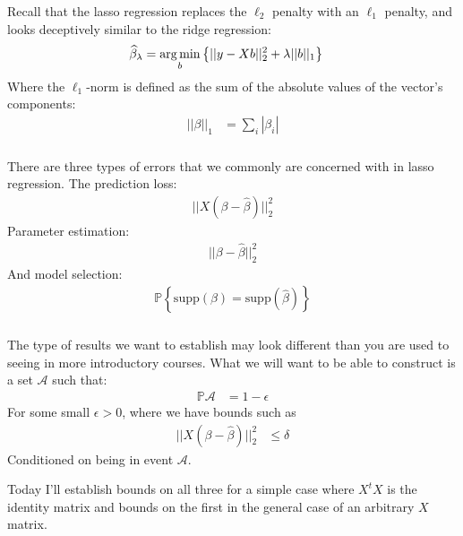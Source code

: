\begin{frame}[fragile] \frametitle{}

Recall that the lasso regression replaces the $\ell_2$ penalty with an $\ell_1$ penalty,
and looks deceptively similar to the ridge regression:
\begin{align*}
\widehat{\beta}_\lambda &= \mathop{\mathrm{arg\,min}}_b \left\{ || y - Xb ||_2^2 + \lambda ||b||_1 \right\}
\end{align*}
Where the $\ell_1$-norm is defined as the sum of the absolute values of the
vector's components:
\begin{align*}
|| \beta ||_1 &= \sum_i | \beta_i |
\end{align*}

\end{frame}

\begin{frame}[fragile] \frametitle{}

There are three types of errors that we commonly are concerned
with in lasso regression. \pause The prediction loss:
\begin{align*}
|| X (\beta - \widehat{\beta}) ||_2^2
\end{align*}
\pause Parameter estimation:
\begin{align*}
|| \beta - \widehat{\beta} ||_2^2
\end{align*}
\pause And model selection:
\begin{align*}
\mathbb{P} \left\{ \text{supp} (\beta) = \text{supp} (\widehat{\beta}) \right\}
\end{align*}

\end{frame}

\begin{frame}[fragile] \frametitle{}

The type of results we want to establish may look different than
you are used to seeing in more introductory courses.
\pause What we will want to be able to construct is a set
$\mathcal{A}$ such that:
\begin{align*}
\mathbb{P} \mathcal{A} &= 1 - \epsilon
\end{align*}
For some small $\epsilon > 0$, where we have bounds such as
\begin{align*}
|| X (\beta - \widehat{\beta}) ||_2^2 &\leq \delta
\end{align*}
Conditioned on being in event $\mathcal{A}$.

\pause Today I'll establish bounds on all three for a simple case
where $X^tX$ is the identity matrix and bounds on the first in the
general case of an arbitrary $X$ matrix.

\end{frame}


